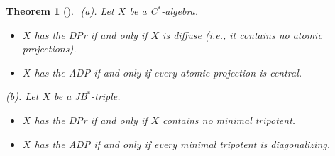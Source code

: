 \documentclass[10pt]{amsart}
\newtheorem{theorem}{Theorem}[section]
\begin{document}
	\begin{theorem}[\textrm{\cite{BeMar2005,Mar2008,MarOikh2004,Oik2002}}]$ $ \newline \label{theorem:DPr-ADP-CstarJBstar}
		\textup{(a).} Let $X$ be a C$^*$-algebra.
		\begin{itemize}
			\item[(a1)] $X$ has the DPr if and only if $X$ is diffuse (i.e., it contains no atomic projections).
			\item[(a2)] $X$ has the ADP if and only if every atomic projection is central.
		\end{itemize}
		\textup{(b).} Let $X$ be a JB$^*$-triple.
		\begin{itemize}
			\item[(b1)] $X$ has the DPr if and only if $X$ contains no minimal tripotent.
			\item[(b2)] $X$ has the ADP if and only if every minimal tripotent is diagonalizing.
		\end{itemize}
	\end{theorem}
	
\end{document}
